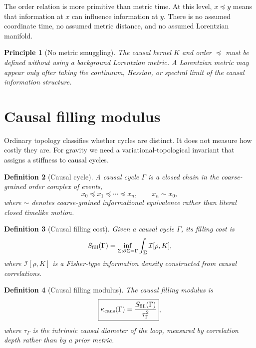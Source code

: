 \documentclass[11pt]{article}
\newtheorem{definition}{Definition}[section]
\newtheorem{principle}[definition]{Principle}
\newcommand{\I}{\mathcal I}
\newcommand{\pre}{\preceq}
\begin{document}
The order relation is more primitive than metric time. At this level, $x\pre y$ means that information at $x$ can influence information at $y$. There is no assumed coordinate time, no assumed metric distance, and no assumed Lorentzian manifold.

\begin{principle}[No metric smuggling]
The causal kernel $K$ and order $\pre$ must be defined without using a background Lorentzian metric. A Lorentzian metric may appear only after taking the continuum, Hessian, or spectral limit of the causal information structure.
\end{principle}

\section{Causal filling modulus}

Ordinary topology classifies whether cycles are distinct. It does not measure how costly they are. For gravity we need a variational-topological invariant that assigns a stiffness to causal cycles.

\begin{definition}[Causal cycle]
A causal cycle $\Gamma$ is a closed chain in the coarse-grained order complex of events,
\begin{equation}
 x_0\pre x_1\pre\cdots\pre x_n,\qquad x_n\sim x_0,
\end{equation}
where $\sim$ denotes coarse-grained informational equivalence rather than literal closed timelike motion.
\end{definition}

\begin{definition}[Causal filling cost]
Given a causal cycle $\Gamma$, its filling cost is
\begin{equation}
S_{\rm fill}(\Gamma)=\inf_{\Sigma:\partial\Sigma=\Gamma}\int_\Sigma \I[\rho,K],
\end{equation}
where $\I[\rho,K]$ is a Fisher-type information density constructed from causal correlations.
\end{definition}

\begin{definition}[Causal filling modulus]
The causal filling modulus is
\begin{equation}
\boxed{\kappa_{\rm caus}(\Gamma)=\frac{S_{\rm fill}(\Gamma)}{\tau_\Gamma^2}},
\end{equation}
where $\tau_\Gamma$ is the intrinsic causal diameter of the loop, measured by correlation depth rather than by a prior metric.
\end{definition}
\end{document}
